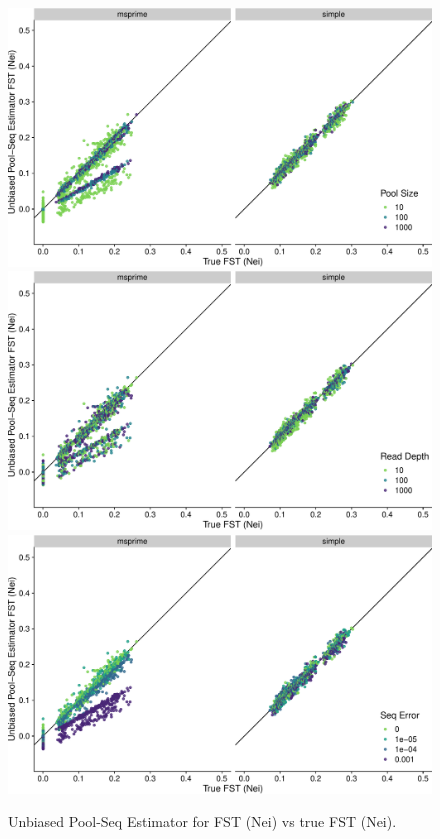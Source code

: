 \documentclass[a4paper,fontsize=9pt,DIV=14]{scrartcl}
\begin{document}
\begin{figure}[p]
    \centering
    \includegraphics[width=.75\linewidth]{true_nei_fst-est_spence_nei-pool_size.pdf}
    \includegraphics[width=.75\linewidth]{true_nei_fst-est_spence_nei-read_depth.pdf}
    \includegraphics[width=.75\linewidth]{true_nei_fst-est_spence_nei-seq_error.pdf}
    \vspace*{-1em}
    \caption{
        Unbiased Pool-Seq Estimator for FST (Nei) vs true FST (Nei).
    }
\label{fig:UnbiasedNei}
\end{figure}
\end{document}

